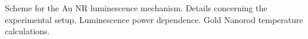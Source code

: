 \documentclass[journal=nalefd,manuscript=letter]{achemso}
\begin{document}
\begin{suppinfo}
Scheme for the Au NR luminescence mechanism.  Details concerning the experimental setup. 
Luminescence power dependence. Gold Nanorod temperature calculations.
\end{suppinfo}



\end{document}
